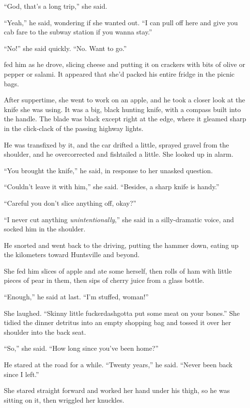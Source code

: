 ``God, that's a long trip,'' she said.

``Yeah,'' he said, wondering if she wanted out.  ``I can pull off here
and give you cab fare to the subway station if you wanna stay.''

``No!'' she said quickly.  ``No.  Want to go.''

 fed him as he drove, slicing cheese and putting it on crackers
with bits of olive or pepper or salami.  It appeared that she'd packed
his entire fridge in the picnic bags.

After suppertime, she went to work on an apple, and he took a closer
look at the knife she was using.  It was a big, black hunting knife,
with a compass built into the handle.  The blade was black except
right at the edge, where it gleamed sharp in the click-clack of the
passing highway lights.

He was transfixed by it, and the car drifted a little, sprayed gravel
from the shoulder, and he overcorrected and fishtailed a little.  She
looked up in alarm.

``You brought the knife,'' he said, in response to her unasked
question.

``Couldn't leave it with him,'' she said.  ``Besides, a sharp knife is
handy.''

``Careful you don't slice anything off, okay?''

``I never cut anything \textit{unintentionally},'' she said in a
silly-dramatic voice, and socked him in the shoulder.

He snorted and went back to the driving, putting the hammer down,
eating up the kilometers toward Huntsville and beyond.

She fed him slices of apple and ate some herself, then rolls of ham
with little pieces of pear in them, then sips of cherry juice from a
glass bottle.

``Enough,'' he said at last.  ``I'm stuffed, woman!''

She laughed.  ``Skinny little fuckerdash{}gotta put some meat on your
bones.'' She tidied the dinner detritus into an empty shopping bag and
tossed it over her shoulder into the back seat.

``So,'' she said.  ``How long since you've been home?''

He stared at the road for a while.  ``Twenty years,'' he said. 
``Never been back since I left.''

She stared straight forward and worked her hand under his thigh, so he
was sitting on it, then wriggled her knuckles.

